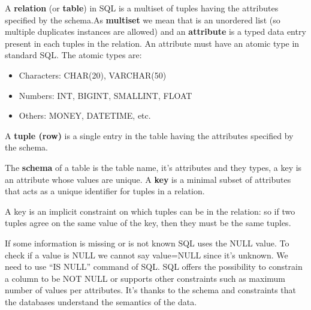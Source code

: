 \documentclass[a4page, 11pt]{article}
\begin{document}
A \textbf{relation} (or \textbf{table}) in SQL is a multiset of tuples having the attributes specified by the schema.As \textbf{multiset} we mean that is an unordered list (so multiple duplicates instances are allowed) and an \textbf{attribute} is a typed data entry present in each tuples in the relation. An attribute must have an atomic type in standard SQL. The atomic types are:
\begin{itemize}[noitemsep]
	\item Characters: CHAR(20), VARCHAR(50)
	\item Numbers: INT, BIGINT, SMALLINT, FLOAT
	\item Others: MONEY, DATETIME, etc.
\end{itemize}
A \textbf{tuple (row)} is a single entry in the table having the attributes specified by the schema.

The \textbf{schema} of a table is the table name, it's attributes and they types, a key is an attribute whose values are unique. A \textbf{key} is a minimal subset of attributes that acts as a unique identifier for tuples in a relation. 

A key is an implicit constraint on which tuples can be in the relation: so if two tuples agree on the same value of the key, then they must be the same tuples. 

If some information is missing or is not known SQL uses the NULL value. To check if a value is NULL we cannot say value=NULL since it's unknown. We need to use ``IS NULL'' command of SQL. SQL offers the possibility to constrain a column to be NOT NULL or supports other constraints such as maximum number of values per attributes.
It's thanks to the schema and constraints that the databases understand the semantics of the data.
\end{document}
